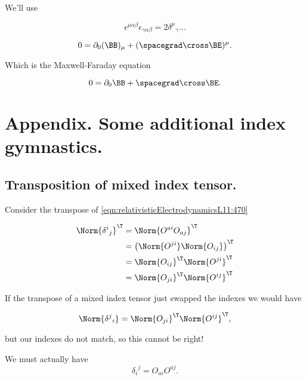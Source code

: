 We'll use

\begin{equation}\label{eqn:relativisticElectrodynamicsL11:890}
\epsilon^{\mu \alpha \beta} \epsilon_{\gamma \alpha \beta} = 2 {\delta^\mu}_\gamma
...
\end{equation}

\begin{equation}\label{eqn:relativisticElectrodynamicsL11:910}
0 = \partial_0 (\BB)_\mu + (\spacegrad \cross \BE)^\mu.
\end{equation}

Which is the Maxwell-Faraday equation

\begin{equation}\label{eqn:relativisticElectrodynamicsL11:930}
0 = \partial_0 \BB + \spacegrad \cross \BE.
\end{equation}

\section{Appendix. Some additional index gymnastics.}%

\subsection{Transposition of mixed index tensor.}

Consider the transpose of \ref{eqn:relativisticElectrodynamicsL11:470}

\begin{align*}
\Norm{ {\delta^i}_j }^\T 
&= 
\Norm{ O^{a i} O_{a j} }^\T \\
&= 
\left( \Norm{ O^{j i} } \Norm{ O_{i j} } \right)^\T \\
&=
\Norm{ O_{i j} }^\T
\Norm{ O^{j i} }^\T  \\
&=
\Norm{ O_{j i} }^\T
\Norm{ O^{i j} }^\T  
\end{align*}

If the transpose of a mixed index tensor just swapped the indexes we would have

\begin{equation}\label{eqn:relativisticElectrodynamicsL11:1060}
\Norm{ {\delta^j}_i } =
\Norm{ O_{j i} }^\T
\Norm{ O^{i j} }^\T,
\end{equation}

but our indexes do not match, so this cannot be right!

We must actually have
\begin{equation}\label{eqn:relativisticElectrodynamicsL11:480}
{\delta_i}^j 
=
O_{a i} 
O^{a j}.
\end{equation}

